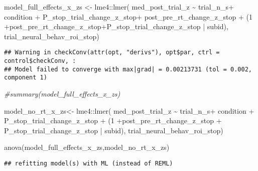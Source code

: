 \documentclass[
]{article}
\newenvironment{Shaded}{\begin{snugshade}}{\end{snugshade}}
\newcommand{\CommentTok}[1]{\textcolor[rgb]{0.56,0.35,0.01}{\textit{#1}}}
\newcommand{\DecValTok}[1]{\textcolor[rgb]{0.00,0.00,0.81}{#1}}
\newcommand{\FunctionTok}[1]{\textcolor[rgb]{0.00,0.00,0.00}{#1}}
\newcommand{\NormalTok}[1]{#1}
\newcommand{\OtherTok}[1]{\textcolor[rgb]{0.56,0.35,0.01}{#1}}
\newcommand{\SpecialCharTok}[1]{\textcolor[rgb]{0.00,0.00,0.00}{#1}}
\begin{document}
\begin{Shaded}
\begin{Highlighting}[]
\NormalTok{model\_full\_effects\_x\_zs }\OtherTok{\textless{}{-}}\NormalTok{ lme4}\SpecialCharTok{::}\FunctionTok{lmer}\NormalTok{(}
\NormalTok{   med\_post\_trial\_z }\SpecialCharTok{\textasciitilde{}}\NormalTok{ trial\_n\_s}\SpecialCharTok{+}\NormalTok{ condition }\SpecialCharTok{+}\NormalTok{ P\_stop\_trial\_change\_z\_stop}\SpecialCharTok{+}\NormalTok{ post\_pre\_rt\_change\_z\_stop }\SpecialCharTok{+}\NormalTok{ (}\DecValTok{1} \SpecialCharTok{+}\NormalTok{post\_pre\_rt\_change\_z\_stop}\SpecialCharTok{+}\NormalTok{P\_stop\_trial\_change\_z\_stop  }\SpecialCharTok{|}\NormalTok{ subid),}
\NormalTok{  trial\_neural\_behav\_roi\_stop)}
\end{Highlighting}
\end{Shaded}

\begin{verbatim}
## Warning in checkConv(attr(opt, "derivs"), opt$par, ctrl = control$checkConv, :
## Model failed to converge with max|grad| = 0.00213731 (tol = 0.002, component 1)
\end{verbatim}

\begin{Shaded}
\begin{Highlighting}[]
\CommentTok{\#summary(model\_full\_effects\_x\_zs)}


\NormalTok{model\_no\_rt\_x\_zs}\OtherTok{\textless{}{-}}\NormalTok{ lme4}\SpecialCharTok{::}\FunctionTok{lmer}\NormalTok{(}
\NormalTok{   med\_post\_trial\_z }\SpecialCharTok{\textasciitilde{}}\NormalTok{ trial\_n\_s}\SpecialCharTok{+}\NormalTok{ condition }\SpecialCharTok{+}\NormalTok{ P\_stop\_trial\_change\_z\_stop }\SpecialCharTok{+}\NormalTok{ (}\DecValTok{1} \SpecialCharTok{+}\NormalTok{post\_pre\_rt\_change\_z\_stop  }\SpecialCharTok{+}\NormalTok{ P\_stop\_trial\_change\_z\_stop  }\SpecialCharTok{|}\NormalTok{ subid),}
\NormalTok{  trial\_neural\_behav\_roi\_stop)}

\FunctionTok{anova}\NormalTok{(model\_full\_effects\_x\_zs,model\_no\_rt\_x\_zs)}
\end{Highlighting}
\end{Shaded}

\begin{verbatim}
## refitting model(s) with ML (instead of REML)
\end{verbatim}
\end{document}
